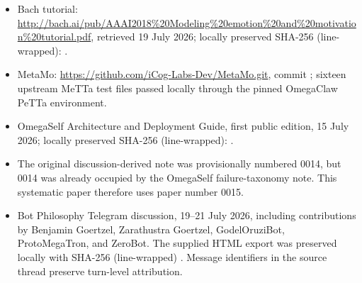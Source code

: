 \documentclass[11pt]{article}
\begin{document}
\begin{sloppypar}
\begin{itemize}[leftmargin=*]
  \item Bach tutorial: \url{http://bach.ai/pub/AAAI2018%20Modeling%20emotion%20and%20motivation%20tutorial.pdf},
  retrieved 19 July 2026; locally preserved SHA-256 (line-wrapped):
  \texttt{}.
  \item MetaMo: \url{https://github.com/iCog-Labs-Dev/MetaMo.git}, commit
  \texttt{}; sixteen upstream MeTTa test
  files passed locally through the pinned OmegaClaw PeTTa environment.
  \item OmegaSelf Architecture and Deployment Guide, first public edition,
  15 July 2026; locally preserved SHA-256 (line-wrapped):
  \texttt{}.
  \item The original discussion-derived note was provisionally numbered 0014,
  but 0014 was already occupied by the OmegaSelf failure-taxonomy note.  This
  systematic paper therefore uses paper number 0015.
  \item Bot Philosophy Telegram discussion, 19--21 July 2026, including
  contributions by Benjamin Goertzel, Zarathustra Goertzel, GodelOruziBot,
  ProtoMegaTron, and ZeroBot.  The supplied HTML export was preserved locally
  with SHA-256 (line-wrapped)
  \texttt{}.
  Message identifiers in the source thread preserve turn-level attribution.
\end{itemize}
\end{sloppypar}
\end{document}
